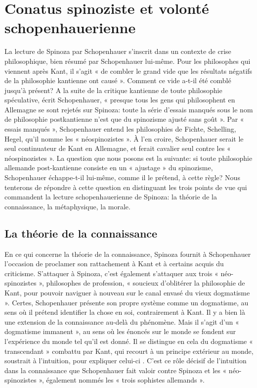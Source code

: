\section{Conatus spinoziste et volonté schopenhauerienne}

La lecture de Spinoza par Schopenhauer s’inscrit dans un contexte de crise philosophique, bien résumé par
Schopenhauer lui-même. Pour les philosophes qui viennent après Kant, il s’agit « de combler le grand vide
que les résultats négatifs de la philosophie kantienne ont causé ».
Comment ce vide a-t-il été comblé jusqu’à présent? A la suite de la critique kantienne de toute philosophie
spéculative, écrit Schopenhauer, « presque tous les gens qui philosophent en Allemagne se sont rejetés sur
Spinoza: toute la série d’essais manqués sous le nom de philosophie postkantienne n’est que du spinozisme
ajusté sans goût ». Par « essais manqués », Schopenhauer entend les philosophies de Fichte, Schelling,
Hegel, qu’il nomme les « néospinozistes ». À l’en croire, Schopenhauer serait le seul continuateur de Kant
en Allemagne, et ferait cavalier seul contre les « néospinozistes ».
La question que nous posons est la suivante: si toute philosophie allemande post-kantienne consiste en un
« ajustage » du spinozisme, Schopenhauer échappe-t-il lui-même, comme il le prétend, à cette règle? Nous
tenterons de répondre à cette question en distinguant les trois points de vue qui commandent la lecture
schopenhauerienne de Spinoza: la théorie de la connaissance, la métaphysique, la morale.

\subsection{La théorie de la connaissance}

En ce qui concerne la théorie de la connaissance, Spinoza fournit à Schopenhauer l’occasion de proclamer
son rattachement à Kant et à certains acquis du criticisme. S’attaquer à Spinoza, c’est également s’attaquer
aux trois « néo-spinozistes », philosophes de profession, « soucieux d’oblitérer la philosophie de Kant, pour
pouvoir naviguer à nouveau sur le canal envasé du vieux dogmatisme ». Certes, Schopenhauer présente son
propre système comme un dogmatisme, au sens où il prétend identifier la chose en soi, contrairement à Kant.
Il y a bien là une extension de la connaissance au-delà du phénomène. Mais il s’agit d’un « dogmatisme
immanent », au sens où les énoncés sur le monde se fondent sur l’expérience du
monde tel qu’il est donné. Il se distingue en cela du dogmatisme « transcendant » combattu par Kant, qui
recourt à un principe extérieur au monde, soustrait à l’intuition, pour expliquer celui-ci . C’est ce rôle
décisif de l’intuition dans la connaissance que Schopenhauer fait valoir contre Spinoza et les « néo-
spinozistes », également nommés les « trois sophistes allemands ».

